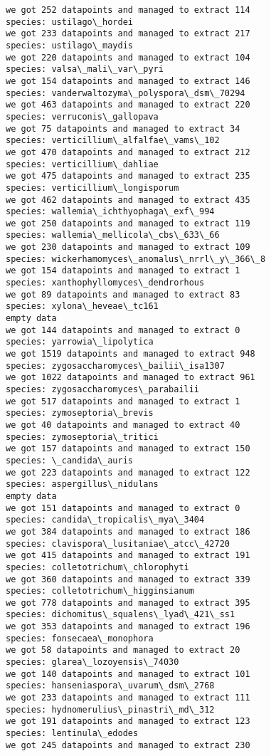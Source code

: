 \documentclass[11pt]{article}
\begin{document}
\begin{Verbatim}[commandchars=\\\{\}]
we got 252 datapoints and managed to extract 114
species: ustilago\_hordei
we got 233 datapoints and managed to extract 217
species: ustilago\_maydis
we got 220 datapoints and managed to extract 104
species: valsa\_mali\_var\_pyri
we got 154 datapoints and managed to extract 146
species: vanderwaltozyma\_polyspora\_dsm\_70294
we got 463 datapoints and managed to extract 220
species: verruconis\_gallopava
we got 75 datapoints and managed to extract 34
species: verticillium\_alfalfae\_vams\_102
we got 470 datapoints and managed to extract 212
species: verticillium\_dahliae
we got 475 datapoints and managed to extract 235
species: verticillium\_longisporum
we got 462 datapoints and managed to extract 435
species: wallemia\_ichthyophaga\_exf\_994
we got 250 datapoints and managed to extract 119
species: wallemia\_mellicola\_cbs\_633\_66
we got 230 datapoints and managed to extract 109
species: wickerhamomyces\_anomalus\_nrrl\_y\_366\_8
we got 154 datapoints and managed to extract 1
species: xanthophyllomyces\_dendrorhous
we got 89 datapoints and managed to extract 83
species: xylona\_heveae\_tc161
empty data
we got 144 datapoints and managed to extract 0
species: yarrowia\_lipolytica
we got 1519 datapoints and managed to extract 948
species: zygosaccharomyces\_bailii\_isa1307
we got 1022 datapoints and managed to extract 961
species: zygosaccharomyces\_parabailii
we got 517 datapoints and managed to extract 1
species: zymoseptoria\_brevis
we got 40 datapoints and managed to extract 40
species: zymoseptoria\_tritici
we got 157 datapoints and managed to extract 150
species: \_candida\_auris
we got 223 datapoints and managed to extract 122
species: aspergillus\_nidulans
empty data
we got 151 datapoints and managed to extract 0
species: candida\_tropicalis\_mya\_3404
we got 384 datapoints and managed to extract 186
species: clavispora\_lusitaniae\_atcc\_42720
we got 415 datapoints and managed to extract 191
species: colletotrichum\_chlorophyti
we got 360 datapoints and managed to extract 339
species: colletotrichum\_higginsianum
we got 778 datapoints and managed to extract 395
species: dichomitus\_squalens\_lyad\_421\_ss1
we got 353 datapoints and managed to extract 196
species: fonsecaea\_monophora
we got 58 datapoints and managed to extract 20
species: glarea\_lozoyensis\_74030
we got 140 datapoints and managed to extract 101
species: hanseniaspora\_uvarum\_dsm\_2768
we got 233 datapoints and managed to extract 111
species: hydnomerulius\_pinastri\_md\_312
we got 191 datapoints and managed to extract 123
species: lentinula\_edodes
we got 245 datapoints and managed to extract 230

\end{Verbatim}
\end{document}
